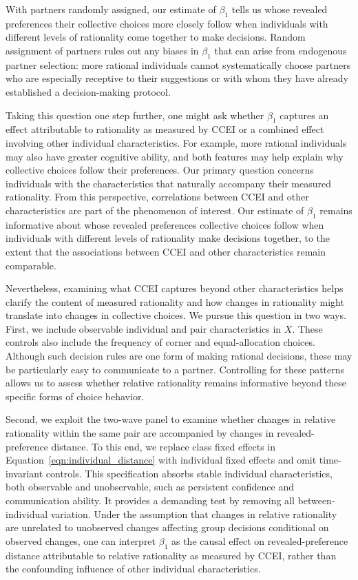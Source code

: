 \documentclass[11 pt]{article}
\begin{document}
With partners randomly assigned, our estimate of $\beta_1$ tells us whose revealed preferences their collective choices more closely follow when individuals with different levels of rationality come together to make decisions. Random assignment of partners rules out any biases in $\beta_1$ that can arise from endogenous partner selection: more rational individuals cannot systematically choose partners who are especially receptive to their suggestions or with whom they have already established a decision-making protocol.

Taking this question one step further, one might ask whether $\beta_1$ captures an effect attributable to rationality as measured by CCEI or a combined effect involving other individual characteristics. For example, more rational individuals may also have greater cognitive ability, and both features may help explain why collective choices follow their preferences. Our primary question concerns individuals with the characteristics that naturally accompany their measured rationality. From this perspective, correlations between CCEI and other characteristics are part of the phenomenon of interest. Our estimate of $\beta_1$ remains informative about whose revealed preferences collective choices follow when individuals with different levels of rationality make decisions together, to the extent that the associations between CCEI and other characteristics remain comparable.

Nevertheless, examining what CCEI captures beyond other characteristics helps clarify the content of measured rationality and how changes in rationality might translate into changes in collective choices. We pursue this question in two ways. First, we include observable individual and pair characteristics in $X$. These controls also include the frequency of corner and equal-allocation choices. Although such decision rules are one form of making rational decisions, these may be particularly easy to communicate to a partner. Controlling for these patterns allows us to assess whether relative rationality remains informative beyond these specific forms of choice behavior.

Second, we exploit the two-wave panel to examine whether changes in relative rationality within the same pair are accompanied by changes in revealed-preference distance. To this end, we replace class fixed effects in Equation~\eqref{eqn:individual_distance} with individual fixed effects and omit time-invariant controls. This specification absorbs stable individual characteristics, both observable and unobservable, such as persistent confidence and communication ability. It provides a demanding test by removing all between-individual variation. Under the assumption that changes in relative rationality are unrelated to unobserved changes affecting group decisions conditional on observed changes, one can interpret $\beta_1$ as the causal effect on revealed-preference distance attributable to relative rationality as measured by CCEI, rather than the confounding influence of other individual characteristics.
\end{document}
